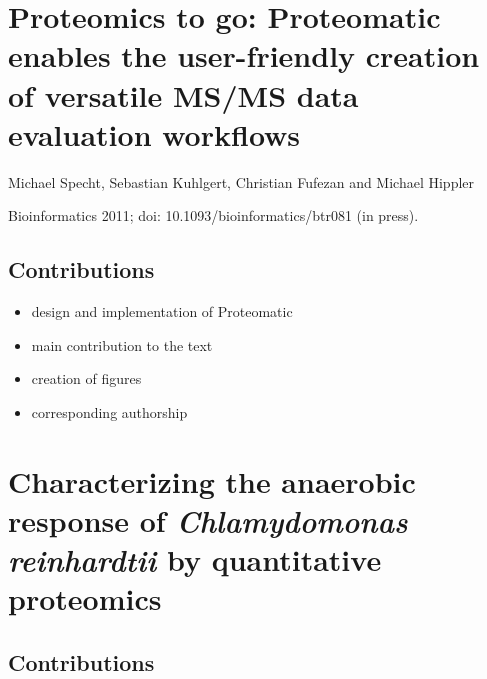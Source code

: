 \cleardoublepage
\section{Proteomics to go: Proteomatic enables the user-friendly creation of versatile MS/MS data evaluation workflows}

Michael Specht, Sebastian Kuhlgert, Christian Fufezan and Michael Hippler

Bioinformatics 2011; doi: 10.1093/bioinformatics/btr081 (in press).

\subsection*{Contributions}

\begin{itemize}
\item design and implementation of Proteomatic
\item main contribution to the text
\item creation of figures
\item corresponding authorship
\end{itemize}


\cleardoublepage
\section{Characterizing the anaerobic response of {\em Chlamydomonas reinhardtii} by quantitative proteomics}

\subsection*{Contributions}


